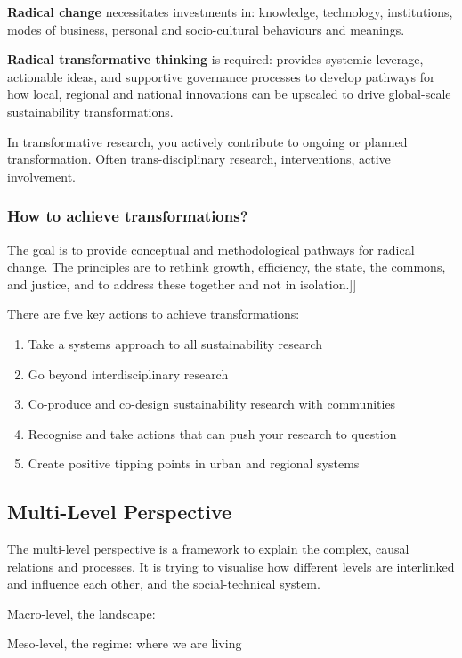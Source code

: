 \documentclass{article}
\begin{document}
\textbf{Radical change} necessitates investments in: knowledge, technology, institutions, modes of business, personal and socio-cultural behaviours and meanings.

\textbf{Radical transformative thinking} is required: provides systemic leverage, actionable ideas, and supportive governance processes to develop pathways for how local, regional and national innovations can be upscaled to drive global-scale sustainability transformations.

In transformative research, you actively contribute to ongoing or planned transformation. Often trans-disciplinary research, interventions, active involvement.

\subsubsection{How to achieve transformations?}

The goal is to provide conceptual and methodological pathways for radical change. 
The principles are to rethink growth, efficiency, the state, the commons, and justice, and to address these together and not in isolation.]]

There are five key actions to achieve transformations:

\begin{enumerate}
	\item Take a systems approach to all sustainability research
	\item Go beyond interdisciplinary research
	\item Co-produce and co-design sustainability research with communities
	\item Recognise and take actions that can push your research to question
	\item Create positive tipping points in urban and regional systems
\end{enumerate}

\subsection{Multi-Level Perspective}

The multi-level perspective is a framework to explain the complex, causal relations and processes. It is trying to visualise how different levels are interlinked and influence each other, and the social-technical system.

Macro-level, the landscape:

Meso-level, the regime: where we are living
\end{document}
